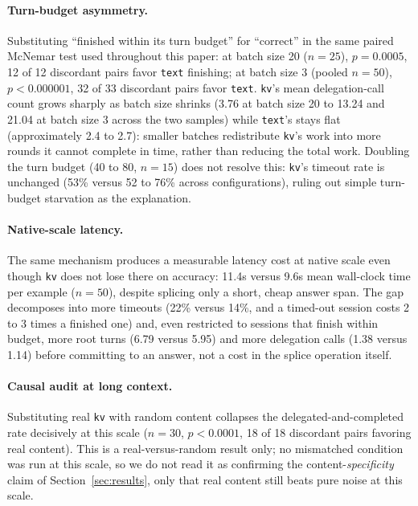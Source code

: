 \documentclass[11pt]{article}
\begin{document}
\paragraph{Turn-budget asymmetry.} Substituting ``finished within its
turn budget'' for ``correct'' in the same paired McNemar test used
throughout this paper: at batch size 20 ($n=25$), $p=0.0005$, 12 of 12
discordant pairs favor \texttt{text} finishing; at batch size 3
(pooled $n=50$), $p<0.000001$, 32 of 33 discordant pairs favor
\texttt{text}. \texttt{kv}'s mean delegation-call count grows sharply
as batch size shrinks (3.76 at batch size 20 to 13.24 and 21.04 at
batch size 3 across the two samples) while \texttt{text}'s stays flat
(approximately 2.4 to 2.7): smaller batches redistribute \texttt{kv}'s
work into more rounds it cannot complete in time, rather than reducing
the total work. Doubling the turn budget (40 to 80, $n=15$) does not
resolve this: \texttt{kv}'s timeout rate is unchanged (53\% versus 52
to 76\% across configurations), ruling out simple turn-budget
starvation as the explanation.

\paragraph{Native-scale latency.} The same mechanism produces a
measurable latency cost at native scale even though \texttt{kv} does
not lose there on accuracy: 11.4s versus 9.6s mean wall-clock time per
example ($n=50$), despite splicing only a short, cheap answer span.
The gap decomposes into more timeouts (22\% versus 14\%, and a
timed-out session costs 2 to 3 times a finished one) and, even
restricted to sessions that finish within budget, more root turns
(6.79 versus 5.95) and more delegation calls (1.38 versus 1.14) before
committing to an answer, not a cost in the splice operation itself.

\paragraph{Causal audit at long context.} Substituting real \texttt{kv}
with random content collapses the delegated-and-completed rate
decisively at this scale ($n=30$, $p<0.0001$, 18 of 18 discordant
pairs favoring real content). This is a real-versus-random result
only; no mismatched condition was run at this scale, so we do not read
it as confirming the content-\emph{specificity} claim of
Section~\ref{sec:results}, only that real content still beats pure
noise at this scale.
\end{document}
